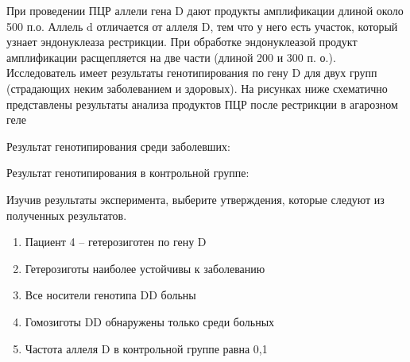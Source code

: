 
При
проведении ПЦР аллели гена D дают
продукты амплификации длиной около 500 п.о. Аллель d отличается от аллеля D,
тем что у него есть участок, который узнает эндонуклеаза рестрикции. При
обработке эндонуклеазой продукт амплификации расщепляется на две части (длиной
200 и 300 п. о.). Исследователь имеет результаты генотипирования по гену D для двух групп (страдающих неким
заболеванием и здоровых). На рисунках ниже схематично представлены результаты
анализа продуктов ПЦР после рестрикции в агарозном геле 

Результат генотипирования среди заболевших:


Результат генотипирования в контрольной
группе:


Изучив результаты эксперимента, выберите
утверждения, которые следуют из полученных результатов.

\begin{enumerate}
    \item Пациент 4 – гетерозиготен по гену D
    \item Гетерозиготы наиболее устойчивы к заболеванию
    \item Все носители генотипа DD больны
    \item Гомозиготы DD обнаружены только среди больных
    \item Частота аллеля D  в контрольной группе равна 0,1
\end{enumerate}



